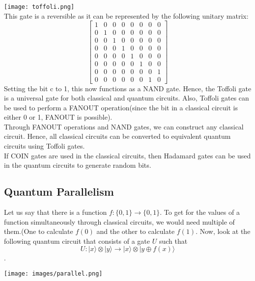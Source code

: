 \documentclass{article}
\begin{document}
\texttt{[image: toffoli.png]}\\[3pt]
This gate is a reversible as it can be represented by the following unitary matrix:
$$\begin{bmatrix}
1 & 0 & 0 & 0 & 0 & 0 & 0 & 0 \\
0 & 1 & 0 & 0 & 0 & 0 & 0 & 0 \\
0 & 0 & 1& 0 & 0 & 0 & 0 & 0 \\
0 & 0 & 0 & 1 & 0 & 0 & 0 & 0 \\
0 & 0 & 0 & 0 & 1 & 0 & 0 & 0 \\
0 & 0 & 0 & 0 & 0 & 1 & 0 & 0 \\
0 & 0 & 0 & 0 & 0 & 0 & 0 & 1 \\
0 & 0 & 0 & 0 & 0 & 0 & 1 & 0
\end{bmatrix}$$
Setting the bit c to 1, this now functions as a NAND gate. Hence, the Toffoli gate is a universal gate for both classical and quantum circuits. Also, Toffoli gates can be used to perform a FANOUT operation(since the bit in a classical circuit is either 0 or 1, FANOUT is possible). \\[3pt]
Through FANOUT operations and NAND gates, we can construct any classical circuit. Hence, all classical circuits can be converted to equivalent quantum circuits using Toffoli gates.\\[3pt]
If COIN gates are used in the classical circuits, then Hadamard gates can be used in the quantum circuits to generate random bits.

\subsection{Quantum Parallelism}
Let us say that there is a function $f:\{0, 1\} \longrightarrow \{0, 1\}$. To get for the values of a function simultaneously through classical circuits, we would need multiple of them.(One to calculate $f(0)$ and the other to calculate $f(1)$. Now, look at the following quantum circuit that consists of a gate $U$ such that $$U: |x \rangle \otimes |y \rangle \longrightarrow |x \rangle \otimes |y \oplus f(x) \rangle$$. 

\texttt{[image: images/parallel.png]}
\end{document}
